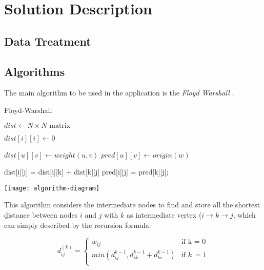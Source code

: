 \documentclass{article}
\begin{document}
\section*{Solution Description}
\subsection*{Data Treatment}

\subsection*{Algorithms}
    The main algorithm to be used in the application is the \textit{Floyd Warshall} \cite{IntroductionToAlgorithms} \cite{FloydWarshal}. \par

    \begin{algorithm}[h]
    \caption{Floyd-Warshall}\label{euclid}
    \begin{algorithmic}[1]
        \State $dist \gets N \times N \text{ matrix}$

            \State $dist[i][i] \gets 0$
        \EndFor

            \State $dist[u][v] \gets weight(u, v)$
            \State $pred[u][v] \gets origin(w)$
        \EndFor

                        \State dist[i][j] = dist[i][k] + dist[k][j]
                        \State pred[i][j] = pred[k][j];
                    \EndIf
                \EndFor
            \EndFor
        \EndFor
    \EndProcedure
    \end{algorithmic}
    \end{algorithm}

    \texttt{[image: algorithm-diagram]}

    This algorithm considers the intermediate nodes to find and store all the shortest \b{distance} between nodes $i$ and $j$ with $k$ as intermediate vertex ($i \rightarrow k \rightarrow j$, which can simply described by the recursion formula:

    \begin{equation}
      d_{ij}^{(k)} =
        \begin{cases}
          w_{ij} & \text{if k = 0}\\
          min(d_{ij}^{k-1}, d_{ik}^{k-1} + d_{ki}^{k-1}) & \text{if } k\>= 1\\
        \end{cases}
    \end{equation}
\end{document}
